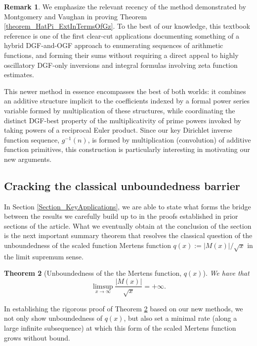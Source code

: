 \documentclass[11pt,reqno,a4letter]{article}
\numberwithin{figure}{section}
\numberwithin{table}{section}
\theoremstyle{plain}
\newtheorem{theorem}{Theorem}
\numberwithin{theorem}{section}
\theoremstyle{definition}
\newtheorem{remark}[theorem]{Remark}
\begin{document}
\begin{remark} 
We emphasize the relevant recency of the method demonstrated by 
Montgomery and Vaughan in proving 
Theorem \ref{theorem_HatPi_ExtInTermsOfGz}. 
To the best of our knowledge, this textbook reference is 
one of the first clear-cut applications documenting something of a hybrid 
DGF-and-OGF approach to enumerating sequences of arithmetic functions, and 
forming their sums without requiring a direct appeal to highly oscillatory 
DGF-only inversions and integral formulas 
involving zeta function estimates. 

This newer method 
in essence encompasses the best of both worlds: it combines an additive structure 
implicit to the coefficients indexed by a formal power series variable formed by 
multiplication of these structures, while coordinating the distinct DGF-best 
property of the multiplicativity of prime powers invoked 
by taking powers of a reciprocal Euler product. Since our key Dirichlet inverse function sequence, 
$g^{-1}(n)$, is formed by multiplication (convolution) 
of additive function primitives, this construction is 
particularly interesting in motivating our new arguments. 
\end{remark} 

\subsection{Cracking the classical unboundedness barrier} 

In Section \ref{Section_KeyApplications}, 
we are able to state what forms the bridge between the results 
we carefully build up to in the proofs established in prior sections of the article. 
What we eventually obtain at the conclusion of the section 
is the next important summary theorem that 
resolves the classical question of the 
unboundedness of the scaled function Mertens function 
$q(x) := |M(x)| / \sqrt{x}$ in the limit supremum sense. 

\begin{theorem}[Unboundedness of the the Mertens function, $q(x)$] 
\label{cor_ThePipeDreamResult_v1} 
We have that 
\[
\limsup_{x \rightarrow \infty} \frac{|M(x)|}{\sqrt{x}} = +\infty. 
\]
\end{theorem} 

In establishing the rigorous proof of 
Theorem \ref{cor_ThePipeDreamResult_v1} 
based on our new methods, we not only show unboundedness of 
$q(x)$, but also set a minimal rate (along a large infinite subsequence) 
at which this form of the 
scaled Mertens function grows without bound. 
\end{document}
